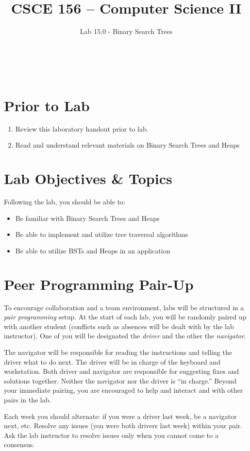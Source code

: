 \documentclass[12pt]{scrartcl}
\title{CSCE 156 -- Computer Science II}
\subtitle{Lab 15.0 - Binary Search Trees}
\author{~}
\date{~}
\begin{document}
\maketitle

\section*{Prior to Lab}

\begin{enumerate}
  \item Review this laboratory handout prior to lab.
  \item Read and understand relevant materials on Binary 
    Search Trees and Heaps
\end{enumerate}

\section*{Lab Objectives \& Topics}
Following the lab, you should be able to:
\begin{itemize}
  \item Be familiar with Binary Search Trees and Heaps
  \item Be able to implement and utilize tree traversal algorithms
  \item Be able to utilize BSTs and Heaps in an application
\end{itemize}


\section*{Peer Programming Pair-Up}

To encourage collaboration and a team environment, labs will be
structured in a \emph{pair programming} setup.  At the start of
each lab, you will be randomly paired up with another student 
(conflicts such as absences will be dealt with by the lab instructor).
One of you will be designated the \emph{driver} and the other
the \emph{navigator}.  

The navigator will be responsible for reading the instructions and
telling the driver what to do next.  The driver will be in charge of the
keyboard and workstation.  Both driver and navigator are responsible
for suggesting fixes and solutions together.  Neither the navigator
nor the driver is ``in charge.''  Beyond your immediate pairing, you
are encouraged to help and interact and with other pairs in the lab.

Each week you should alternate: if you were a driver last week, 
be a navigator next, etc.  Resolve any issues (you were both drivers
last week) within your pair.  Ask the lab instructor to resolve issues
only when you cannot come to a consensus.  
\end{document}

